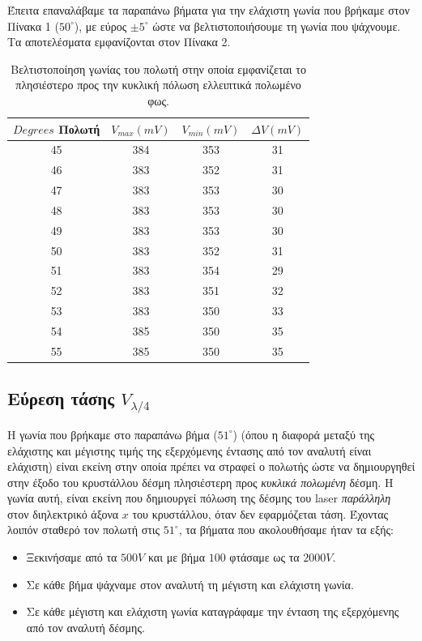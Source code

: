 \documentclass[a4paper,11pt,titlepage]{article}
\newcommand{\degrees}{^{\circ}}
\begin{document}
\newpage

Έπειτα επαναλάβαμε τα παραπάνω βήματα για την ελάχιστη γωνία που βρήκαμε στον Πίνακα 1 ($50\degrees$), με εύρος $\pm 5\degrees$ ώστε να βελτιστοποιήσουμε τη γωνία που ψάχνουμε. Τα αποτελέσματα εμφανίζονται στον Πίνακα 2.

\begin{table} [H]
\centering
\begin{tabular}{|c|c|c|c|}
\hline \rule[-2ex]{0pt}{5.5ex} $Degrees$ Πολωτή & $V_{max} (mV)$ & $V_{min} (mV)$ & $\Delta V (mV)$ \\ 
\hline \rule[-2ex]{0pt}{5.5ex} 45 & 384 & 353 & 31 \\ 
\hline \rule[-2ex]{0pt}{5.5ex} 46 & 383 & 352 & 31 \\ 
\hline \rule[-2ex]{0pt}{5.5ex} 47 & 383 & 353 & 30 \\ 
\hline \rule[-2ex]{0pt}{5.5ex} 48 & 383 & 353 & 30 \\ 
\hline \rule[-2ex]{0pt}{5.5ex} 49 & 383 & 353 & 30 \\ 
\hline \rule[-2ex]{0pt}{5.5ex} 50 & 383 & 352 & 31 \\ 
\hline \rule[-2ex]{0pt}{5.5ex} 51 & 383 & 354 & 29 \\ 
\hline \rule[-2ex]{0pt}{5.5ex} 52 & 383 & 351 & 32 \\ 
\hline \rule[-2ex]{0pt}{5.5ex} 53 & 383 & 350 & 33 \\ 
\hline \rule[-2ex]{0pt}{5.5ex} 54 & 385 & 350 & 35 \\ 
\hline \rule[-2ex]{0pt}{5.5ex} 55 & 385 & 350 & 35 \\ 
\hline 
\end{tabular} 
\caption{Βελτιστοποίηση γωνίας του πολωτή στην οποία εμφανίζεται το πλησιέστερο προς την κυκλική πόλωση ελλειπτικά πολωμένο φως.}
\end{table}

\subsection{Εύρεση τάσης $V_{\lambda/4}$}

Η γωνία που βρήκαμε στο παραπάνω βήμα ($51\degrees$) (όπου η διαφορά μεταξύ της ελάχιστης και μέγιστης τιμής της εξερχόμενης έντασης από τον αναλυτή είναι ελάχιστη) είναι εκείνη στην οποία πρέπει να στραφεί ο πολωτής ώστε να δημιουργηθεί στην έξοδο του κρυστάλλου δέσμη πλησιέστερη προς \textit{κυκλικά πολωμένη} δέσμη. H γωνία αυτή, είναι εκείνη που δημιουργεί πόλωση της δέσμης του laser \textit{παράλληλη} στον διηλεκτρικό άξονα $x$ του κρυστάλλου, όταν δεν εφαρμόζεται τάση. Έχοντας λοιπόν σταθερό τον πολωτή στις $51\degrees$, τα βήματα που ακολουθήσαμε ήταν τα εξής:
\begin{itemize}
\item Ξεκινήσαμε από τα $500 V$ και με βήμα $100$ φτάσαμε ως τα $2000 V$.
\item Σε κάθε βήμα ψάχναμε στον αναλυτή τη μέγιστη και ελάχιστη γωνία.
\item Σε κάθε μέγιστη και ελάχιστη γωνία καταγράφαμε την ένταση της εξερχόμενης από τον αναλυτή δέσμης.
\end{itemize}
\end{document}
